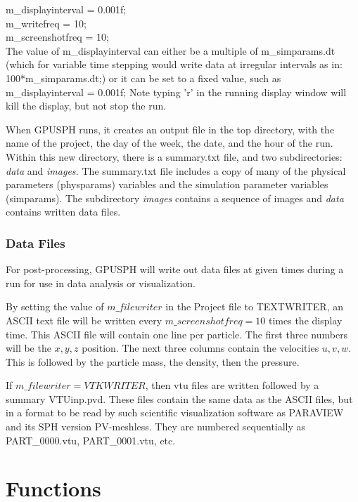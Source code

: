 \documentclass[12pt]{memoir}
\begin{document}
{{{\noindent m\_displayinterval = 0.001f; \\ m\_writefreq = 10;\\
m\_screenshotfreq = 10;\\

The value of m\_displayinterval can either be a multiple of
m\_simparams.dt (which for variable time stepping would write data at
irregular intervals as in: 100*m\_simparams.dt;) or it can be set to a
fixed value, such as m\_displayinterval = 0.001f; Note typing 'r' in
the running display window will kill the display, but not stop the run.

When GPUSPH runs, it creates an output file in the top directory, with
the name of the project, the day of the week, the date, and the hour of
the run. Within this new directory, there is a summary.txt file, and
two subdirectories: {\em data} and {\em images.} The summary.txt file
includes a copy of many of the physical parameters (physparams)
variables and the simulation parameter variables (simparams). The
subdirectory {\em images} contains a sequence of images and {\em data}
contains written data files.


\subsection{Data Files} For post-processing, GPUSPH will write out data
files at given times during a run for use in data analysis or
visualization.

By setting the value of $m\_filewriter$ in the Project file to
TEXTWRITER, an ASCII text file will be written every $ m\_screenshotfreq
= 10 $ times the display time. This ASCII file will contain one line
per particle. The first three numbers will be the $x, y, z$ position.
The next three columns contain the velocities $u, v, w$. This is
followed by the particle mass, the density, then the pressure.

If $m\_filewriter = VTKWRITER$, then vtu files are written followed by a
summary VTUinp.pvd. These files contain the same data as the ASCII
files, but in a format to be read by such scientific visualization
software as PARAVIEW and its SPH version PV-meshless. They are numbered
sequentially as PART\_0000.vtu, PART\_0001.vtu, etc.






\appendix
\appendixpage

\chapter{Functions}

}}}
\end{document}
